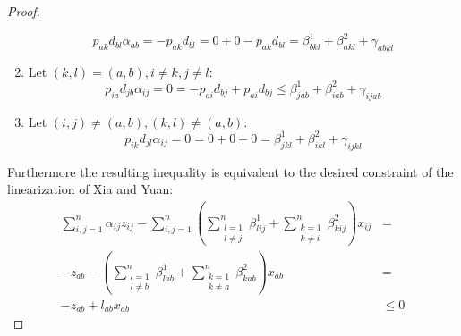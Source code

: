 \begin{proof}
\begin{enumerate}
\begin{equation*}
				p_{ak}d_{bl}\alpha_{ab} = -p_{ak}d_{bl} = 0 + 0 -p_{ak}d_{bl} = \beta^1_{bkl} + \beta^2_{akl} + \gamma_{abkl}
			\end{equation*}
		\item Let $(k,l) = (a,b), i\neq k, j\neq l$:
			\begin{equation*}
				p_{ia}d_{jb}\alpha_{ij} = 0 = -p_{ai}d_{bj} + p_{ai}d_{bj} \leq \beta^1_{jab} + \beta^2_{iab} + \gamma_{ijab}
			\end{equation*}
		\item Let $(i,j)\neq(a,b), (k,l) \neq (a,b)$:
			\begin{equation*}
				p_{ik}d_{jl}\alpha_{ij} = 0 = 0 + 0 + 0 = \beta^1_{jkl} + \beta^2_{ikl} + \gamma_{ijkl}
			\end{equation*}
	\end{enumerate}
	Furthermore the resulting inequality is equivalent to the desired constraint of the linearization of Xia and Yuan:
	\begin{align*}
		\sum_{i,j=1}^n\alpha_{ij}z_{ij} - \sum_{i,j=1}^n \left(\sum_{\substack{l=1\\l\neq j}}^n \beta^1_{lij} + \sum_{\substack{k=1\\k\neq i}}^n\beta^2_{kij}\right)x_{ij} & =\\
		-z_{ab} - \left(\sum_{\substack{l=1\\l\neq b}}^n \beta^1_{lab} + \sum_{\substack{k=1\\k\neq a}}^n\beta^2_{kab}\right)x_{ab} & =\\
		-z_{ab} + l_{ab}x_{ab} &\leq 0
	\end{align*}
\end{proof}

